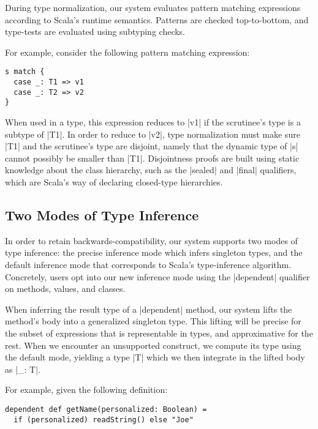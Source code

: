 During type normalization, our system evaluates pattern matching expressions according to Scala's runtime semantics.
Patterns are checked top-to-bottom, and type-tests are evaluated using subtyping checks.

For example, consider the following pattern matching expression:

\begin{lstlisting}
s match {
  case _: T1 => v1
  case _: T2 => v2
}
\end{lstlisting}

\noindent
When used in a type, this expression reduces to |v1| if the scrutinee's type is a subtype of |T1|.
In order to reduce to |v2|, type normalization must make sure |T1| and the scrutinee's type are disjoint, namely that the dynamic type of |s| cannot possibly be smaller than |T1|.
Disjointness proofs are built using static knowledge about the class hierarchy, such as the |sealed| and |final| qualifiers, which are Scala's way of declaring closed-type hierarchies.

\subsection{Two Modes of Type Inference}

In order to retain backwards-compatibility, our system supports two modes of type inference: the precise inference mode which infers singleton types, and the default inference mode that corresponds to Scala's type-inference algorithm.
Concretely, users opt into our new inference mode using the |dependent| qualifier on methods, values, and classes.

When inferring the result type of a |dependent| method, our system lifts the method's body into a generalized singleton type.
This lifting will be precise for the subset of expressions that is representable in types, and approximative for the rest.
When we encounter an unsupported construct, we compute its type using the default mode, yielding a type |T| which we then integrate in the lifted body as |_: T|\footnotemark.

For example, given the following definition:

\begin{lstlisting}
dependent def getName(personalized: Boolean) =
  if (personalized) readString() else "Joe"
\end{lstlisting}

